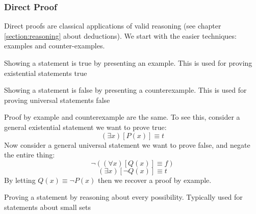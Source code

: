 \documentclass[main.tex]{subfiles}
\begin{document}
\subsubsection{Direct Proof}

Direct proofs are classical applications of valid reasoning (see chapter \ref{section:reasoning} about deductions). We start with the easier techniques: examples and counter-examples.

\begin{defn}
	Showing a statement is true by presenting an example. This is used for proving existential statements true
\end{defn}



\begin{defn}
	Showing a statement is false by presenting a counterexample. This is used for proving universal statements false
\end{defn}


\begin{rem}
	Proof by example and counterexample are the same. To see this, consider a general existential statement we want to prove true: \[(\exists x)[P(x)] \equiv t\]
	Now consider a general universal statement we want to prove false, and negate the entire thing: \[\lnot ((\forall x)[Q(x)] \equiv f)\] \[(\exists x)[\lnot Q(x)] \equiv t\]
	By letting \(Q(x) \equiv \lnot P(x)\) then we recover a proof by example.
\end{rem}

\begin{defn}
	Proving a statement by reasoning about every possibility. Typically used for statements about small sets
\end{defn}

\end{document}

